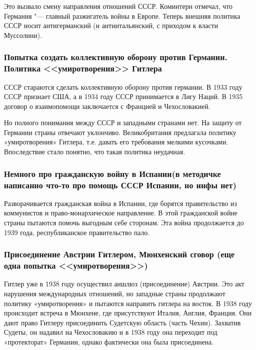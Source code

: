 Это вызвало смену направления отношений СССР. Коминтерн отмечал, что Германия "--- главный разжигатель войны в Европе. Теперь внешняя политика СССР носит антигерманский (и антиитальянский, с приходом к власти Муссолини). 

\subsubsection{\textbf{Попытка создать коллективную оборону против Германии. Политика <<умиротворения>> Гитлера}}

СССР стараются сделать коллективную оборону против германии. В 1933 году СССР признает США, а в 1934 году СССР принимается в Лигу Наций. В 1935 договор о взаимопомощи заключается с Францией и Чехословакией.

Но полного понимания между СССР и западными странами нет. На защиту от Германии страны отвечают уклончиво. Великобритания предлагала политику «умиротворения» Гитлера, т.е. давать его требования мелкими кусочками. Впоследствие стало понятно, что такая политика неудачная. 

\subsubsection{\textbf{Немного про гражданскую войну в Испании(в методичке написанно что-то про помощь СССР Испании, но инфы нет)}}

Разворачивается гражданская война в Испании, где борятся правительство из коммунистов и право-монархическое направление. В этой гражданской войне страны пытаются помочь выгодным себе сторонам. Эта война продолжается до 1939 года, республиканское правительство пало.

\subsubsection{\textbf{Присоединение Австрии Гитлером, Мюнхенский сговор (еще одна попытка <<умиротворения>>)}}

Гитлер уже в 1938 году осуществил аншлюз (присоединение) Австрии. Это акт нарушения международных отношений, но западные страны продолжают политику «умиротворения» и пытаются направить гитлера на восток. В 1938 году происходит встреча в Мюнхене, где присутствуют Италия, Англия, Франция. Они дают право Гитлеру присоединить Судетскую область (часть Чехии). Захватив Судеты, он надавил на Чехословакию и в 1938 году она переходит под «протекторат» Германии, однако фактически она была присоединена.

